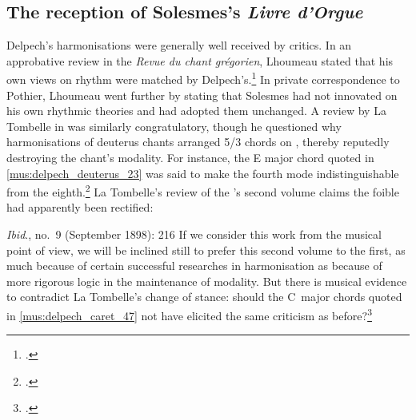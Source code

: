 \subsection{The reception of Solesmes's \emph{Livre d'Orgue}}
Delpech's harmonisations were generally well received by critics.
In an approbative review in the \emph{Revue du chant grégorien}, Lhoumeau stated that his own views on rhythm were matched by Delpech's.\footcite[168]{LhoumeaulivreorgueSolesmes1898}
In private correspondence to Pothier, Lhoumeau went further by stating that Solesmes had not innovated on his own rhythmic theories and had adopted them unchanged.
%
A review by La Tombelle in \tsg{} was similarly congratulatory, though he questioned why harmonisations of deuterus chants arranged 5/3 chords on , thereby reputedly destroying the chant's modality.
For instance, the E\kern 1pt\flat{} major chord quoted in \cref{mus:delpech_deuterus_23} was said to make the fourth mode indistinguishable from the eighth.\footcite[143]{LaTombelleNotesbibliographiquesLivre1898a}
La Tombelle's review of the \ldo{}'s second volume claims the foible had apparently been rectified:

  {\emph{Ibid}., no.~9 (September 1898): 216}
{If we consider this work from the musical point of view, we will be inclined still to prefer this second volume to the first, as much because of certain successful researches in harmonisation as because of more rigorous logic in the maintenance of modality.}
\nocite{LaTombelleNotesbibliographiquesLivre1898}%
\pagebreak{}
\noindent
But there is musical evidence to contradict La Tombelle's change of stance: should the C~major chords quoted in \cref{mus:delpech_caret_47} not have elicited the same criticism as before?\footcite[23, 47]{LivreOrgueChants1898}
%

